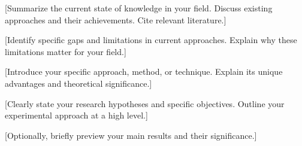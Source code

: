 
[Summarize the current state of knowledge in your field. Discuss existing approaches
and their achievements. Cite relevant literature.]



[Identify specific gaps and limitations in current approaches. Explain why these
limitations matter for your field.]



[Introduce your specific approach, method, or technique. Explain its unique advantages
and theoretical significance.]



[Clearly state your research hypotheses and specific objectives. Outline your
experimental approach at a high level.]



[Optionally, briefly preview your main results and their significance.]


\label{sec:introduction}

